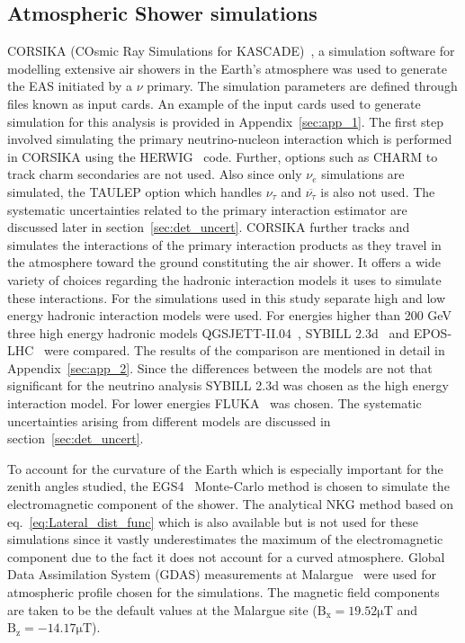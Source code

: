 \subsection{Atmospheric Shower simulations}
\label{subsec:sim_EAS}
CORSIKA (COsmic Ray Simulations for KASCADE)~\cite{Heck:1998vt}, a simulation software for modelling extensive air showers in the Earth's atmosphere was used to generate the EAS initiated by a $\nu$ primary. The simulation parameters are defined through files known as input cards. An example of the input cards used to generate simulation for this analysis is provided in Appendix~\ref{sec:app_1}. The first step involved simulating the primary neutrino-nucleon interaction which is performed in CORSIKA using the HERWIG~\cite{Corcella:2000bw} code. Further, options such as CHARM to track charm secondaries are not used. Also since only $\nu_e$ simulations are simulated, the TAULEP option which handles $\nu_{\tau}$ and $\overline{\nu_{\tau}}$ is also not used. The systematic uncertainties related to the primary interaction estimator are discussed later in section~\ref{sec:det_uncert}. CORSIKA further tracks and simulates the interactions of the primary interaction products as they travel in the atmosphere toward the ground constituting the air shower. It offers a wide variety of choices regarding the hadronic interaction models it uses to simulate these interactions. For the simulations used in this study separate high and low energy hadronic interaction models were used. For energies higher than 200 GeV three high energy hadronic models QGSJETT-II.04~\cite{Ostapchenko:2010vb}, SYBILL 2.3d~\cite{Riehn:2019jet} and EPOS-LHC~\cite{Pierog:2013ria} were compared. The results of the comparison are mentioned in detail in Appendix~\ref{sec:app_2}. Since the differences between the models are not that significant for the neutrino analysis SYBILL 2.3d was chosen as the high energy interaction model. For lower energies FLUKA~\cite{Ferrari:2005zk,Battistoni:2015epi} was chosen. The systematic uncertainties arising from different models are discussed in section~\ref{sec:det_uncert}.  

To account for the curvature of the Earth which is especially important for the zenith angles studied, the EGS4~\cite{Nelson:1990sr} Monte-Carlo method is chosen to simulate the electromagnetic component of the shower. The analytical NKG method based on eq.~\ref{eq:Lateral_dist_func} which is also available but is not used for these simulations since it vastly underestimates the maximum of the electromagnetic component due to the fact it does not account for a curved atmosphere. Global Data Assimilation System (GDAS) measurements at Malargue~\cite{PierreAuger:2012jsu} were used for atmospheric profile chosen for the simulations. The magnetic field components are taken to be the default values at the Malargue site ($\mathrm{B_x = 19.52\mu T}$ and $\mathrm{B_z = -14.17\mu T}$). 

